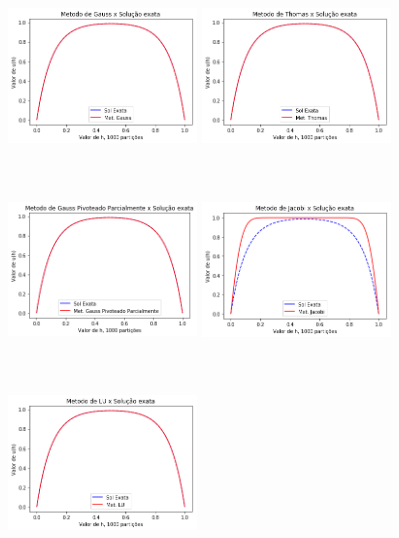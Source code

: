\documentclass{article}
\begin{document}
\begin{itemize}
\begin{figure}[!htb]
\includegraphics[width=5cm,height=5cm]{G1000part.png}
\includegraphics [width=5cm,height=5cm]{T1000part}
\includegraphics [width=5cm,height=5cm]{GP1000part.png}
\includegraphics [width=5cm,height=5cm]{J1000part.png}
\includegraphics [width=5cm,height=5cm]{LU1000part.png}

\end{figure}
\end{itemize}
\end{document}
